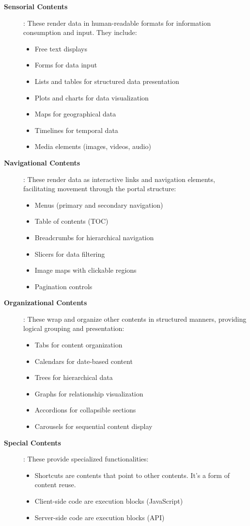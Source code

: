 \begin{description}
\item[\textbf{Sensorial Contents}]: These render data in human-readable formats for information consumption and input. They include:
\begin{itemize}
\item Free text displays
\item Forms for data input
\item Lists and tables for structured data presentation
\item Plots and charts for data visualization
\item Maps for geographical data
\item Timelines for temporal data
\item Media elements (images, videos, audio)
\end{itemize}

\item[\textbf{Navigational Contents}]: These render data as interactive links and navigation elements, facilitating movement through the portal structure:
\begin{itemize}
\item Menus (primary and secondary navigation)
\item Table of contents (TOC)
\item Breadcrumbs for hierarchical navigation
\item Slicers for data filtering
\item Image maps with clickable regions
\item Pagination controls
\end{itemize}

\item[\textbf{Organizational Contents}]: These wrap and organize other contents in structured manners, providing logical grouping and presentation:
\begin{itemize}
\item Tabs for content organization
\item Calendars for date-based content
\item Trees for hierarchical data
\item Graphs for relationship visualization
\item Accordions for collapsible sections
\item Carousels for sequential content display
\end{itemize}

\item[\textbf{Special Contents}]: These provide specialized functionalities:
\begin{itemize}
\item Shortcuts are contents that point to other contents. It's a form of content reuse.
\item Client-side code are execution blocks (JavaScript)
\item Server-side code are execution blocks (API)
\end{itemize}
\end{description}

